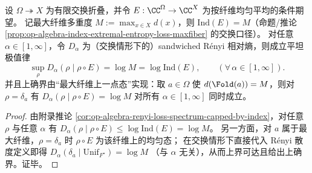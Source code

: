 \begin{corollary}\label{cor:dephys-renyi-flatness-fold-commutative}
设 \(\Omega\twoheadrightarrow X\) 为有限交换折叠，并令 \(E:\CC^{\Omega}\to\CC^{X}\) 为按纤维均匀平均的条件期望。
记最大纤维多重度 \(M:=\max_{x\in X}d(x)\)，则 \(\mathrm{Ind}(E)=M\)（命题/推论 \ref{prop:op-algebra-index-extremal-entropy-loss-maxfiber} 的交换口径）。
对任意 \(\alpha\in[1,\infty]\)，令 \(D_\alpha\) 为（交换情形下的）sandwiched Rényi 相对熵，则成立平坦极值律
\[
\boxed{\;
\sup_{\rho}D_\alpha(\rho\mid\rho\circ E)=\log M=\log\mathrm{Ind}(E),\qquad(\forall\,\alpha\in[1,\infty]).\;}
\]
并且上确界由“最大纤维上一点态”实现：取 \(a\in\Omega\) 使 \(d(\Fold(a))=M\)，则对 \(\rho=\delta_a\) 有
\(
D_\alpha(\rho\mid\rho\circ E)=\log M
\)
对所有 \(\alpha\in[1,\infty]\) 同时成立。
\end{corollary}

\begin{proof}
由附录推论 \ref{cor:op-algebra-renyi-loss-spectrum-capped-by-index}，对任意 \(\rho\) 与任意 \(\alpha\) 有
\(
D_\alpha(\rho\mid\rho\circ E)\le \log\mathrm{Ind}(E)=\log M
\)。
另一方面，对 \(a\) 属于最大纤维，\(\rho=\delta_a\) 时 \(\rho\circ E\) 为该纤维上的均匀态；
在交换情形下直接代入 Rényi 散度定义即得
\(
D_\alpha(\delta_a\mid \mathrm{Unif}_{F^\star})=\log M
\)
（与 \(\alpha\) 无关），从而上界可达且给出上确界。证毕。
\end{proof}

\endinput
